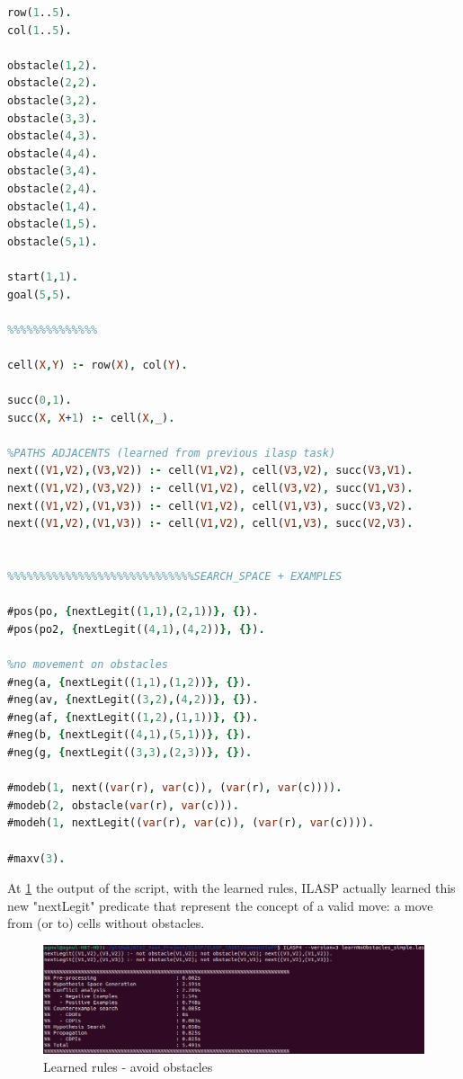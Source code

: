 \newpage

\begin{lstlisting}[language=Prolog]
%%%%%%%%%%%%%%%%%%%%%%%%%%%%%%learn how to move on cells without obstacles
row(1..5).
col(1..5).

obstacle(1,2).
obstacle(2,2).
obstacle(3,2).
obstacle(3,3).
obstacle(4,3).
obstacle(4,4).
obstacle(3,4).
obstacle(2,4).
obstacle(1,4).
obstacle(1,5).
obstacle(5,1).

start(1,1).
goal(5,5).

%%%%%%%%%%%%%%

cell(X,Y) :- row(X), col(Y).

succ(0,1).
succ(X, X+1) :- cell(X,_).

%PATHS ADJACENTS (learned from previous ilasp task)
next((V1,V2),(V3,V2)) :- cell(V1,V2), cell(V3,V2), succ(V3,V1).
next((V1,V2),(V3,V2)) :- cell(V1,V2), cell(V3,V2), succ(V1,V3).
next((V1,V2),(V1,V3)) :- cell(V1,V2), cell(V1,V3), succ(V3,V2).
next((V1,V2),(V1,V3)) :- cell(V1,V2), cell(V1,V3), succ(V2,V3).


%%%%%%%%%%%%%%%%%%%%%%%%%%%%%SEARCH_SPACE + EXAMPLES

#pos(po, {nextLegit((1,1),(2,1))}, {}).
#pos(po2, {nextLegit((4,1),(4,2))}, {}).

%no movement on obstacles
#neg(a, {nextLegit((1,1),(1,2))}, {}).
#neg(av, {nextLegit((3,2),(4,2))}, {}).
#neg(af, {nextLegit((1,2),(1,1))}, {}).
#neg(b, {nextLegit((4,1),(5,1))}, {}).
#neg(g, {nextLegit((3,3),(2,3))}, {}).

#modeb(1, next((var(r), var(c)), (var(r), var(c)))).
#modeb(2, obstacle(var(r), var(c))).
#modeh(1, nextLegit((var(r), var(c)), (var(r), var(c)))).

#maxv(3).
\end{lstlisting}
At \ref{fig:asd2} the output of the script, with the learned rules, ILASP actually learned this new "nextLegit" predicate that represent the concept of a valid move: a move from (or to) cells without obstacles.

\begin{figure}
	\centering
	\includegraphics[scale=0.45]{img/learn_noObstacles.png}
	\caption{Learned rules - avoid obstacles}\label{fig:asd2}
\end{figure}

